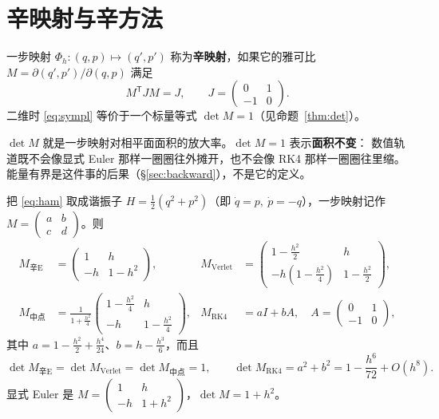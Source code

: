 \section{辛映射与辛方法}
\label{sec:sympl}

\begin{definition}[辛映射，二维]
一步映射 $\Phi_h:(q,p)\mapsto(q',p')$ 称为\textbf{辛映射}，如果它的雅可比 $M=\partial(q',p')/\partial(q,p)$ 满足
\begin{equation}
  M^{\mathsf T}JM=J,\qquad J=\begin{pmatrix}0&1\\-1&0\end{pmatrix}.
  \label{eq:sympl}
\end{equation}
二维时 \eqref{eq:sympl} 等价于一个标量等式 $\det M=1$（见命题~\ref{thm:det}）。
\end{definition}

\begin{remark}
$\det M$ 就是一步映射对相平面面积的放大率。$\det M=1$ 表示\textbf{面积不变}：
数值轨道既不会像显式 Euler 那样一圈圈往外摊开，也不会像 RK4 那样一圈圈往里缩。
能量有界是这件事的后果（\S\ref{sec:backward}），不是它的定义。
\end{remark}

\begin{theorem}
\label{thm:det}
把 \eqref{eq:ham} 取成谐振子 $H=\tfrac12(q^2+p^2)$（即 $\dot q=p,\ \dot p=-q$），一步映射记作
$M=\begin{pmatrix}a&b\\c&d\end{pmatrix}$。则
\begin{align}
  M_{\text{辛E}}&=\begin{pmatrix}1&h\\-h&1-h^2\end{pmatrix},
  & M_{\text{Verlet}}&=\begin{pmatrix}1-\tfrac{h^2}{2}&h\\-h\left(1-\tfrac{h^2}{4}\right)&1-\tfrac{h^2}{2}\end{pmatrix},\\
  M_{\text{中点}}&=\frac{1}{1+\tfrac{h^2}{4}}\begin{pmatrix}1-\tfrac{h^2}{4}&h\\-h&1-\tfrac{h^2}{4}\end{pmatrix},
  & M_{\text{RK4}}&=aI+bA,\quad A=\begin{pmatrix}0&1\\-1&0\end{pmatrix},
\end{align}
其中 $a=1-\tfrac{h^2}{2}+\tfrac{h^4}{24}$、$b=h-\tfrac{h^3}{6}$，而且
\begin{equation}
  \det M_{\text{辛E}}=\det M_{\text{Verlet}}=\det M_{\text{中点}}=1,\qquad
  \det M_{\text{RK4}}=a^2+b^2=1-\frac{h^6}{72}+O(h^8).
  \label{eq:dets}
\end{equation}
显式 Euler 是 $M=\begin{pmatrix}1&h\\-h&1+h^2\end{pmatrix}$，$\det M=1+h^2$。
\end{theorem}

